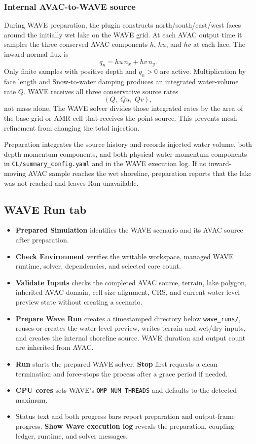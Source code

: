 \documentclass[11pt,a4paper]{article}
\newcommand{\control}[1]{\textbf{#1}}
\newcommand{\pathcode}[1]{\texttt{#1}}
\begin{document}
\subsubsection{Internal AVAC-to-WAVE source}

During WAVE preparation, the plugin constructs north/south/east/west faces
around the initially wet lake on the WAVE grid. At each AVAC output time it
samples the three conserved AVAC components $h$, $hu$, and $hv$ at each face.
The inward normal flux is
\[
q_n = hu\,n_x + hv\,n_y.
\]
Only finite samples with positive depth and $q_n>0$ are active. Multiplication
by face length and Snow-to-water damping produces an integrated water-volume
rate $Q$. WAVE receives all three conservative source rates
\[
(Q,\; Q u,\; Q v),
\]
not mass alone. The WAVE solver divides those integrated rates by the area of
the base-grid or AMR cell that receives the point source. This prevents mesh
refinement from changing the total injection.

Preparation integrates the source history and records injected water volume,
both depth-momentum components, and both physical water-momentum components in
\pathcode{CL/summary\_config.yaml} and in the WAVE execution log. If no
inward-moving AVAC sample reaches the wet shoreline, preparation reports that
the lake was not reached and leaves Run unavailable.

\subsection{WAVE Run tab}

\begin{itemize}
  \item \control{Prepared Simulation} identifies the WAVE scenario and its
        AVAC source after preparation.
  \item \control{Check Environment} verifies the writable workspace, managed
        WAVE runtime, solver, dependencies, and selected core count.
  \item \control{Validate Inputs} checks the completed AVAC source, terrain,
        lake polygon, inherited AVAC domain, cell-size alignment, CRS, and
        current water-level preview state without creating a scenario.
  \item \control{Prepare Wave Run} creates a timestamped directory below
        \pathcode{wave\_runs/}, reuses or creates the water-level preview,
        writes terrain and wet/dry inputs, and creates the internal shoreline
        source. WAVE duration and output count are inherited from AVAC.
  \item \control{Run} starts the prepared WAVE solver. \control{Stop} first
        requests a clean termination and force-stops the process after a grace
        period if needed.
  \item \control{CPU cores} sets WAVE's \pathcode{OMP\_NUM\_THREADS} and
        defaults to the detected maximum.
  \item Status text and both progress bars report preparation and output-frame
        progress. \control{Show Wave execution log} reveals the preparation,
        coupling ledger, runtime, and solver messages.
\end{itemize}
\end{document}
